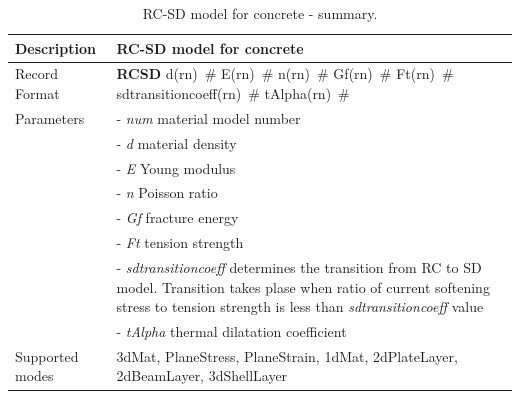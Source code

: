 \documentclass[epsf,a4paper]{article}
\newcommand{\descitem}[1]{{\noindent \bf #1}}
\newcommand{\elemparam}[2]{{{#1\tiny (#2)}~\#}}
\newcommand{\param}[1]{{\it #1}}
\begin{document}
\begin{table}[h]                                                                
\begin{tabular}{|l|p{9cm}|}                                                      
\hline                                                                          
Description & RC-SD model for concrete\\
\hline                                                                          
Record Format & \descitem{RCSD} \elemparam{d}{rn} \elemparam{E}{rn}
\elemparam{n}{rn} \elemparam{Gf}{rn} \elemparam{Ft}{rn} \elemparam{sdtransitioncoeff}{rn} \elemparam{tAlpha}{rn} \\
Parameters &- \param{num} material model number\\
&- \param{d} material density\\
&- \param{E} Young modulus\\
&- \param{n} Poisson ratio\\
&- \param{Gf} fracture energy\\
&- \param{Ft} tension strength\\
&- \param{sdtransitioncoeff} determines the transition from RC to SD
model. Transition takes plase when ratio of current softening
stress to tension strength is less than  \param{sdtransitioncoeff} value\\
&- \param{tAlpha} thermal dilatation coefficient\\
Supported modes& 3dMat, PlaneStress, PlaneStrain, 1dMat,
2dPlateLayer, 2dBeamLayer, 3dShellLayer\\
\hline
\end{tabular}                                                                   
\caption{RC-SD model for  concrete - summary.}                
\label{rcsd_table}                                                         
\end{table}                                                                     
\end{document}
